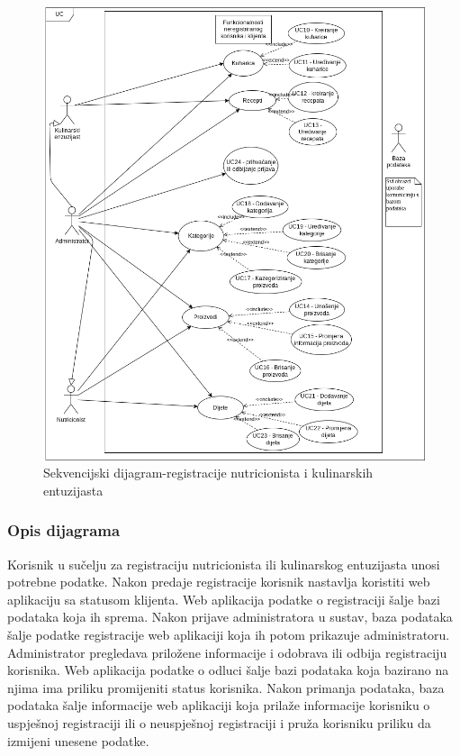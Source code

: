 					\begin{figure}[H]
						\centering
						\includegraphics[scale=0.5]{dijagrami/sekvencijski-dijagram-registracije-nutricionista-i-kulinarskih-entuzijasta.png}
						\caption{Sekvencijski dijagram-registracije nutricionista i kulinarskih entuzijasta}
						\label{fig:sekv-registracija}
					\end{figure}
					\subsubsection{Opis dijagrama}
						Korisnik u sučelju za registraciju nutricionista ili kulinarskog entuzijasta unosi potrebne podatke. Nakon predaje registracije korisnik nastavlja koristiti web aplikaciju sa statusom klijenta. Web aplikacija podatke o registraciji šalje bazi podataka koja ih sprema. Nakon prijave administratora u sustav, baza podataka šalje podatke registracije web aplikaciji koja ih potom prikazuje administratoru. Administrator pregledava priložene informacije i odobrava ili odbija registraciju korisnika. Web aplikacija podatke o odluci  šalje bazi podataka koja bazirano na njima ima priliku promijeniti status korisnika. Nakon primanja podataka, baza podataka šalje informacije web aplikaciji koja prilaže informacije korisniku o uspješnoj registraciji ili o neuspješnoj registraciji i pruža korisniku priliku da izmijeni unesene podatke. 





